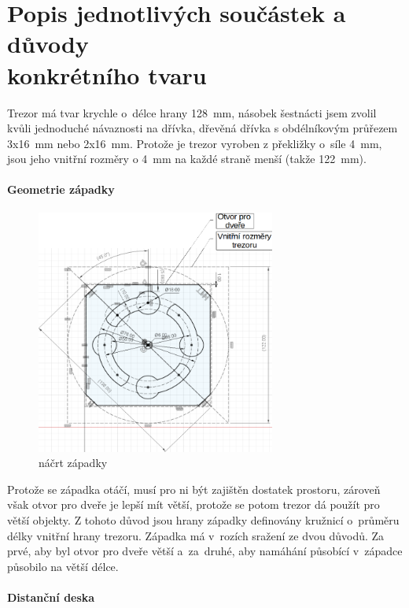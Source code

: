 \section{Popis jednotlivých součástek a důvody \\ konkrétního tvaru}

Trezor má tvar krychle o~délce hrany 128~mm, násobek šestnácti jsem zvolil kvůli jednoduché návaznosti na dřívka, %
dřevěná dřívka s obdélníkovým průřezem 3x16~mm nebo 2x16~mm.
Protože je trezor vyroben z překližky o~síle 4~mm, jsou jeho vnitřní rozměry o 4~mm na každé straně menší (takže 122~mm).

\paragraph{Geometrie západky}
\begin{figure}[h]
	\centering
    \includegraphics[width=0.7\textwidth]{kapitoly/obrazky/M3/geometrie_zapadky.png}
    \caption{náčrt západky} %
    \label{fig:M3-geometrie-zapadky}
\end{figure} 

Protože se západka otáčí, musí pro ni být zajištěn dostatek prostoru, zároveň však otvor pro dveře je lepší mít větší, protože se potom trezor dá použít pro větší objekty.
Z tohoto důvod jsou hrany západky definovány kružnicí o~průměru délky vnitřní hrany trezoru. Západka má v~rozích sražení ze dvou důvodů. Za prvé, aby byl otvor pro
dveře větší a~za~druhé, aby namáhání působící v~západce působilo na větší délce.


\paragraph{Distanční deska}

